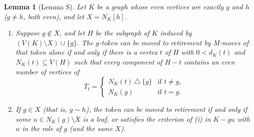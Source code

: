 \documentclass[11pt]{amsart}
\newtheorem{lemma}[theorem]{Lemma}
\theoremstyle{definition}
\begin{document}
\begin{lemma}[Lemma S]\label{lem:S}
Let $K$ be a graph whose even vertices are exactly $g$ and $h$ ($g\ne h$, both even), and let
$X=N_K[h]$.
\begin{enumerate}[label=(\roman*)]
\item Suppose $g\notin X$, and let $H$ be the subgraph of $K$ induced by $(V(K)\setminus X)\cup\{g\}$. The
$g$-token can be moved to retirement by M-moves of that token alone if and only if
there is a vertex $t$ of $H$ with $0<d_K(t)$ and $N_K(t)\subseteq V(H)$ such that every component of $H-t$
contains an even number of vertices of
\[T_t=\begin{cases}N_K(t)\,\triangle\,\{g\}&\text{if }t\ne g,\\ N_K(g)&\text{if }t=g.\end{cases}\]
\item If $g\in X$ (that is, $g\sim h$), the token can be moved to retirement if and only if some $u\in N_K(g)\setminus X$ is a leaf,
or satisfies the criterion of (i) in $K-gu$ with $u$ in the role of $g$ (and the same $X$).
\end{enumerate}
\end{lemma}
\end{document}
